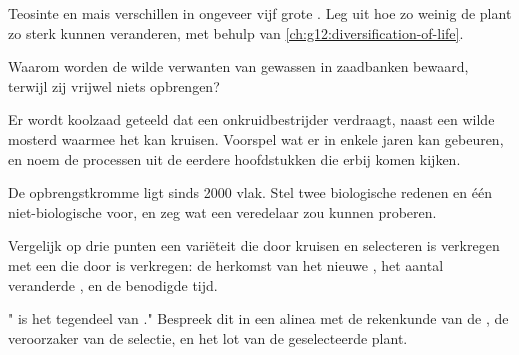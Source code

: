 \begin{exercise}[$\star\star$]\label{exo:g12:domesticated-plants:10}
Teosinte en mais verschillen in ongeveer vijf grote . Leg uit hoe zo
weinig  de plant zo sterk kunnen veranderen, met behulp van
\cref{ch:g12:diversification-of-life}.
\end{exercise}

\begin{exercise}[$\star\star$]\label{exo:g12:domesticated-plants:11}
Waarom worden de wilde verwanten van gewassen in zaadbanken bewaard,
terwijl zij vrijwel niets opbrengen?
\end{exercise}

\begin{exercise}[$\star\star\star$]\label{exo:g12:domesticated-plants:12}
Er wordt koolzaad geteeld dat een onkruidbestrijder verdraagt, naast een
wilde mosterd waarmee het kan kruisen. Voorspel wat er in enkele jaren kan
gebeuren, en noem de processen uit de eerdere hoofdstukken die erbij komen
kijken.
\end{exercise}

\begin{exercise}[$\star\star\star$]\label{exo:g12:domesticated-plants:13}
De opbrengstkromme ligt sinds 2000 vlak. Stel twee biologische redenen en
één niet-biologische voor, en zeg wat een veredelaar zou kunnen proberen.
\end{exercise}

\begin{exercise}[$\star\star\star$]\label{exo:g12:domesticated-plants:14}
Vergelijk op drie punten een variëteit die door kruisen en selecteren is
verkregen met een die door  is verkregen: de herkomst van het
nieuwe , het aantal veranderde , en de benodigde tijd.
\end{exercise}

\begin{exercise}[$\star\star\star$]\label{exo:g12:domesticated-plants:15}
" is het tegendeel van ." Bespreek dit in
een alinea met de rekenkunde van de , de veroorzaker van
de selectie, en het lot van de geselecteerde plant.
\end{exercise}

